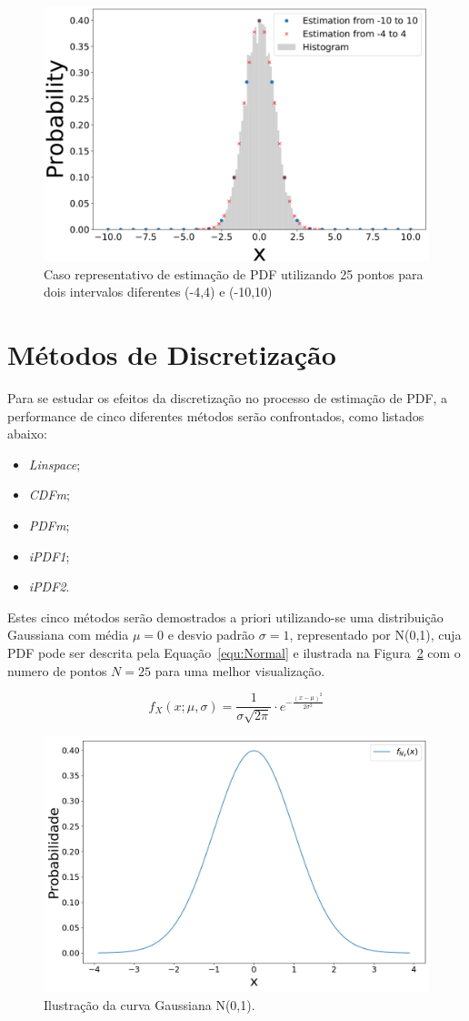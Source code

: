 \begin{figure}[H]
	\centering
	\includegraphics[width=0.6\linewidth]{figuras/linspace2}
	\caption{Caso representativo de estimação de PDF utilizando 25 pontos para dois intervalos diferentes (-4,4) e (-10,10)}
	\label{fig:figura1}
\end{figure}


\section{Métodos de Discretização} \label{cap:metodos}
Para se estudar os efeitos da discretização no processo de estimação de \ac{PDF}, a performance de cinco diferentes métodos serão confrontados, como listados abaixo: 
\begin{itemize}
	\item \textit{Linspace};
	\item \textit{CDFm};
	\item \textit{PDFm};
	\item \textit{iPDF1};
	\item \textit{iPDF2}.
\end{itemize}

Estes cinco métodos serão demostrados a priori  utilizando-se uma distribuição Gaussiana com média $\mu = 0$ e desvio padrão $\sigma = 1$, representado por N(0,1), cuja \ac{PDF} pode ser descrita pela Equação~\eqref{equ:Normal} e ilustrada na Figura~\ref{fig:Gaussiana} com o numero de pontos $N = 25$ para uma melhor visualização.

\begin{equation}
{\displaystyle f_{X}(x;\mu,\sigma) = \frac{1}{\sigma\sqrt{2\pi}}\cdot e^{-\frac{(x-\mu)^2}{2\sigma^2}}}
\label{equ:Normal}
\end{equation}


\begin{figure}[H]
	\centering
	\includegraphics[width=0.6\linewidth]{./figuras/Normal}
	\caption{Ilustração da curva Gaussiana N(0,1).}
	\label{fig:Gaussiana}
\end{figure}

